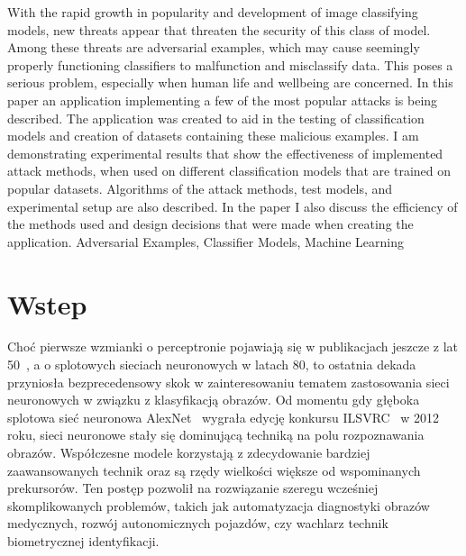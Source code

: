 \documentclass[
    left=2.5cm,         %
    right=2.5cm,        %
    top=2.5cm,          %
    bottom=3cm,         %
    bindingoffset=6mm,  %
    nohyphenation=false %
]{eiti/eiti-thesis}
\begin{document}
\newpage
\abstract With the rapid growth in popularity and development of image classifying models, new threats appear that threaten the security of this class of model.
Among these threats are adversarial examples, which may cause seemingly properly functioning classifiers to malfunction and misclassify data.
This poses a serious problem, especially when human life and wellbeing are concerned.
In this paper an application implementing a few of the most popular attacks is being described.
The application was created to aid in the testing of classification models and creation of datasets containing these malicious examples.
I am demonstrating experimental results that show the effectiveness of implemented attack methods, when used on different classification models that are trained on popular datasets.
Algorithms of the attack methods, test models, and experimental setup are also described.
In the paper I also discuss the efficiency of the methods used and design decisions that were made when creating the application.
\keywords Adversarial Examples, Classifier Models, Machine Learning

\cleardoublepage  %
\pagestyle{plain}
\makeauthorship

\cleardoublepage %
\tableofcontents

\cleardoublepage %
\pagestyle{headings}

\section{Wstep}
Choć pierwsze wzmianki o perceptronie pojawiają się w publikacjach jeszcze z lat 50~\cite{TIBKAT:271027045},
a o splotowych sieciach neuronowych w latach 80\cite{doi:10.1162/neco.1989.1.4.541}, to ostatnia dekada przyniosła bezprecedensowy skok w zainteresowaniu
tematem zastosowania sieci neuronowych w związku z klasyfikacją obrazów.
Od momentu gdy głęboka splotowa sieć neuronowa AlexNet~\cite{NIPS2012_4824} wygrała edycję konkursu ILSVRC~\cite{ILSVRC15} w 2012 roku, sieci neuronowe stały się
dominującą techniką na polu rozpoznawania obrazów.
Współczesne modele korzystają z zdecydowanie bardziej zaawansowanych technik oraz są rzędy wielkości większe
od wspominanych prekursorów.
Ten postęp pozwolił na rozwiązanie szeregu wcześniej skomplikowanych problemów, takich jak automatyzacja diagnostyki obrazów medycznych,
rozwój autonomicznych pojazdów, czy wachlarz technik biometrycznej identyfikacji.
\end{document}

